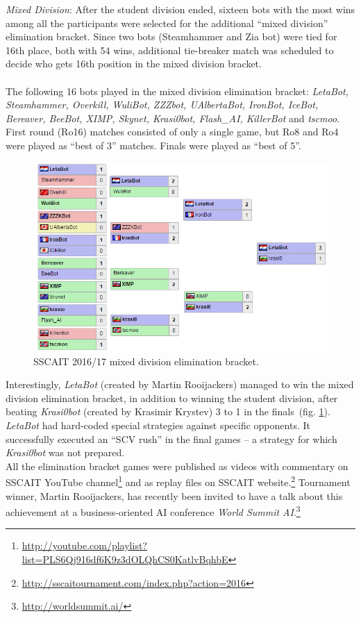 \emph{Mixed Division}: After the student division ended, sixteen bots with the most wins among all the participants were selected for the additional “mixed division” elimination bracket. Since two bots (Steamhammer and Zia bot) were tied for 16th place, both with 54 wins, additional tie-breaker match was scheduled to decide who gets 16th position in the mixed division bracket. \\
\\
The following 16 bots played in the mixed division elimination bracket: {\em LetaBot, Steamhammer, Overkill, WuliBot, ZZZbot, UAlbertaBot, IronBot, IceBot, Bereaver, BeeBot, XIMP, Skynet, Krasi0bot, Flash\_AI, KillerBot} and {\em tscmoo}. First round (Ro16) matches consisted of only a single game, but Ro8 and Ro4 were played as ``best of 3'' matches. Finals were played as ``best of 5''.\\

\begin{figure}[h] 
  \centering
  \includegraphics[width=1.04\columnwidth]{fig/sscait-bracket.png}
  \caption{SSCAIT 2016/17 mixed division elimination bracket.}
  \label{figSSCAITbracket}
\end{figure}
 
Interestingly, {\em LetaBot} (created by Martin Rooijackers) managed to win the mixed division elimination bracket, in addition to winning the student division, after beating {\em Krasi0bot} (created by Krasimir Krystev) 3 to 1 in the finals~(fig. \ref{figSSCAITbracket}). {\em LetaBot} had hard-coded special strategies against specific opponents. It successfully executed an ``SCV rush'' in the final games -- a strategy for which {\em Krasi0bot} was not prepared.\\ 

All the elimination bracket games were published as videos with commentary on SSCAIT YouTube channel\footnote{\url{http://youtube.com/playlist?list=PLS6Qj916df6K9z3dOLQhCS0KatlvBqhbE}} and as replay files on SSCAIT website.\footnote{\url{http://sscaitournament.com/index.php?action=2016}} Tournament winner, Martin Rooijackers, has recently been invited to have a talk about this achievement at a business-oriented AI conference {\em World Summit AI}.\footnote{\url{http://worldsummit.ai/}} 



